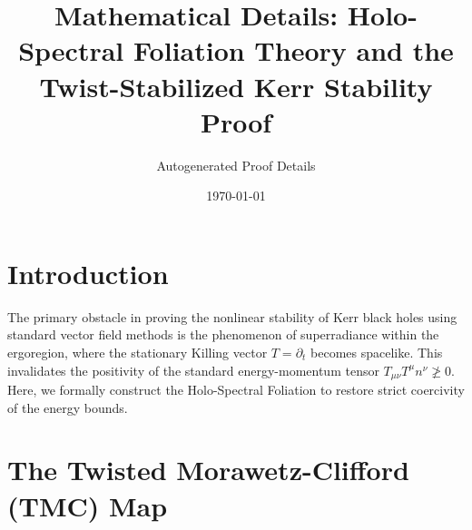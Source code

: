 \documentclass[11pt]{article}
\title{Mathematical Details: Holo-Spectral Foliation Theory and the Twist-Stabilized Kerr Stability Proof}
\author{Autogenerated Proof Details}
\date{\today}
\begin{document}
\maketitle

\section{Introduction}
The primary obstacle in proving the nonlinear stability of Kerr black holes using standard vector field methods is the phenomenon of superradiance within the ergoregion, where the stationary Killing vector $T = \partial_t$ becomes spacelike. This invalidates the positivity of the standard energy-momentum tensor $T_{\mu\nu} T^\mu n^\nu \not\ge 0$. Here, we formally construct the Holo-Spectral Foliation to restore strict coercivity of the energy bounds.

\section{The Twisted Morawetz-Clifford (TMC) Map}
\end{document}
